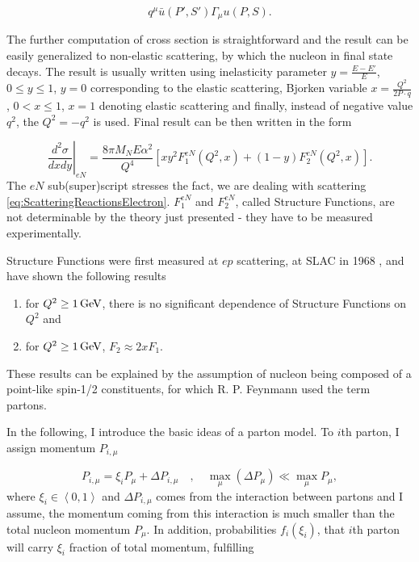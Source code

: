 \begin{equation}
  q^\mu \bar{u}(P',S')\Gamma_\mu u(P,S).
  \label{eq:ScatteringGaugeInvariance}
\end{equation}

The further computation of cross section is straightforward and the result can
be easily generalized to non-elastic scattering, by which the nucleon in final
state decays. The result is usually written using inelasticity parameter
$y=\frac{E-E'}{E}$, $0 \leq y \leq 1$, $y=0$ corresponding to the elastic
scattering, Bjorken variable $ x = \frac{Q^2}{2 P \cdot q}$, $ 0 < x \leq 1$, $x
= 1$ denoting elastic scattering and finally, instead of negative value $q^2$, the
$Q^2 = -q^2$ is used. Final result can be then written in the form

\begin{equation}
  \left. \frac{d^2\sigma}{dxdy} \right|_{eN} =
  \frac{8 \pi M_N E \alpha^2}{Q^4} \left[ x y^2 F_1^{eN}(Q^2, x)
  + (1-y) F_2^{eN}(Q^2,x) \right].
  \label{eq:ScatteringRes1}
\end{equation}
The $eN$ sub(super)script stresses the fact, we are dealing with scattering
\eqref{eq:ScatteringReactionsElectron}. 
$F_1^{eN}$ and $F_2^{eN}$, called Structure Functions, are not determinable by
the theory just presented - they have to be measured experimentally.

Structure Functions were first measured at $ep$ scattering, at SLAC in 1968
\cite{ePScattering}, and have shown the following results
\begin{enumerate}
  \item for $Q^2 \geq 1\,\text{GeV}$, there is no significant dependence of Structure
    Functions on $Q^2$ and
  \item for $Q^2 \geq 1\,\text{GeV}$, $F_2 \approx 2xF_1$.
\end{enumerate}
These results can be explained by the assumption of nucleon being composed of a
point-like spin-1/2 constituents, for which R. P. Feynmann used the term
partons. 

In the following, I introduce the basic ideas of a parton model. To $i$th parton,
I assign momentum $P_{i,\mu}$

\begin{equation}
  P_{i,\mu} = \xi_i P_\mu + \Delta P_{i,\mu} 
    \quad , \quad \max_\mu (\Delta P_\mu) \ll \max_\mu P_\mu,
  \label{PartonsMomentumDistriburtionAssumption}
\end{equation}
where $\xi_i \in \left< 0, 1 \right>$ and $\Delta P_{i,\mu}$ comes from the
interaction between partons and I assume, the momentum coming from this
interaction is much smaller than the total nucleon momentum $P_\mu$. In
addition, probabilities $f_i(\xi_i)$, that $i$th parton will carry $\xi_i$
fraction of total momentum, fulfilling


